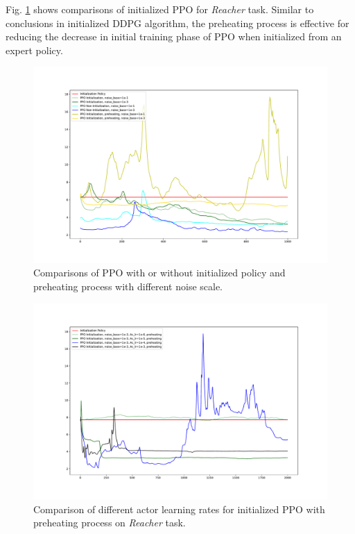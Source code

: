 \documentclass{article}
\begin{document}
Fig. \ref{fig:ppo1} shows comparisons of initialized PPO for \textit{Reacher} task. Similar to conclusions in initialized DDPG algorithm, the preheating process is effective for reducing the decrease in initial training phase of PPO when initialized from an expert policy.
\begin{figure}[htbp]
	\centering
	\includegraphics[scale=0.4]{img/ppo_compare2.pdf}
	\caption{Comparisons of PPO with or without initialized policy and preheating process with different noise scale.}
	\label{fig:ppo1}
\end{figure}

\begin{figure}[htbp]
	\centering
	\includegraphics[scale=0.4]{img/ppo_compare3.pdf}
	\caption{Comparison of different actor learning rates for initialized PPO with preheating process on \textit{Reacher} task.}
	\label{fig:ppo2}
\end{figure}
\end{document}
